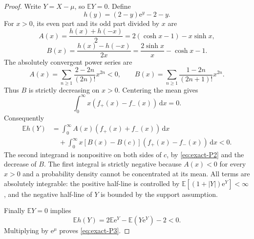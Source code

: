 \begin{proof} Write \(Y=X-\mu\), so \(\mathbb{E}Y=0\). Define
\begin{equation}
 h(y)=(2-y)\mathrm{e}^y-2-y.
\end{equation}
For \(x>0\), its even part and its odd part divided by \(x\) are
\begin{equation}
 A(x)=\frac{h(x)+h(-x)}2=2(\cosh x-1)-x\sinh x,
\end{equation}
\begin{equation}
 B(x)=\frac{h(x)-h(-x)}{2x}
      =\frac{2\sinh x}{x}-\cosh x-1.
\end{equation}
The absolutely convergent power series are
\begin{equation}
 A(x)=\sum_{n\ge1}\frac{2-2n}{(2n)!}x^{2n}<0,
 \qquad
 B(x)=\sum_{n\ge1}\frac{1-2n}{(2n+1)!}x^{2n}.
\end{equation}
Thus \(B\) is strictly decreasing on \(x>0\). Centering the mean gives
\begin{equation}
 \int_0^\infty x(f_+(x)-f_-(x))\,\mathrm{d}x=0.
\end{equation}
Consequently
\begin{equation}
\begin{aligned}
 \mathbb{E}h(Y)
 &=\int_0^\infty A(x)(f_+(x)+f_-(x))\,\mathrm{d}x\\
 &\quad+\int_0^\infty x[B(x)-B(c)](f_+(x)-f_-(x))\,\mathrm{d}x<0. \label{eq:exact-P4}
\end{aligned}
\end{equation}
The second integrand is nonpositive on both sides of \(c\), by \eqref{eq:exact-P2} and the decrease of \(B\). The first integral is strictly negative because \(A(x)<0\) for every \(x>0\) and a probability density cannot be concentrated at its mean. All terms are absolutely integrable: the positive half-line is controlled by \(\mathbb{E}[(1+|Y|)\mathrm{e}^Y]<\infty\), and the negative half-line of \(Y\) is bounded by the support assumption.

Finally \(\mathbb{E}Y=0\) implies
\begin{equation}
 \mathbb{E}h(Y)=2\mathbb{E}\mathrm{e}^Y-\mathbb{E}(Y\mathrm{e}^Y)-2<0.
\end{equation}
Multiplying by \(\mathrm{e}^\mu\) proves \eqref{eq:exact-P3}. \end{proof}

